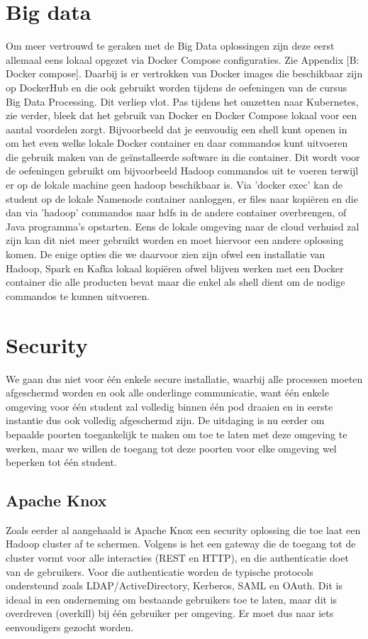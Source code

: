 \section{Big data}
Om meer vertrouwd te geraken met de Big Data oplossingen zijn deze eerst allemaal eens lokaal opgezet via Docker Compose configuraties. Zie Appendix [B: Docker compose].
Daarbij is er vertrokken van Docker images die beschikbaar zijn op DockerHub en die ook gebruikt worden tijdens de oefeningen van de cursus Big Data Processing.
\newline
\newline
Dit verliep vlot. Pas tijdens het omzetten naar Kubernetes, zie verder, bleek dat het gebruik van Docker en Docker Compose lokaal voor een aantal voordelen zorgt. Bijvoorbeeld dat je eenvoudig een shell kunt openen in om het even welke lokale Docker container en daar commandos kunt uitvoeren die gebruik maken van de geïnstalleerde software in die container. Dit wordt voor de oefeningen gebruikt om bijvoorbeeld Hadoop commandos uit te voeren terwijl er op de lokale machine geen hadoop beschikbaar is. Via 'docker exec' kan de student op de lokale Namenode container aanloggen, er files naar kopiëren en die dan via 'hadoop' commandos naar hdfs in de andere container overbrengen, of Java programma's opstarten.
Eens de lokale omgeving naar de cloud verhuisd zal zijn kan dit niet meer gebruikt worden en moet hiervoor een andere oplossing komen. De enige opties die we daarvoor zien zijn ofwel een installatie van Hadoop, Spark en Kafka lokaal kopiëren ofwel blijven werken met een Docker container die alle producten bevat maar die enkel als shell dient om de nodige commandos te kunnen uitvoeren.
\newline

\section{Security}
We gaan dus niet voor \'e\'en enkele secure installatie, waarbij alle processen moeten afgeschermd worden en ook alle onderlinge communicatie, want \'e\'en enkele omgeving voor \'e\'en student zal volledig binnen \'e\'en pod draaien en in eerste instantie dus ook volledig afgeschermd zijn.
De uitdaging is nu eerder om bepaalde poorten toegankelijk te maken om toe te laten met deze omgeving te werken, maar we willen de toegang tot deze poorten voor elke omgeving wel beperken tot \'e\'en student.

\subsection{Apache Knox}
Zoals eerder al aangehaald is Apache Knox een security oplossing die toe laat een Hadoop cluster af te schermen.
Volgens \textcite{Knox2023} is het een gateway die de toegang tot de cluster vormt voor alle interacties (REST en HTTP), en die authenticatie doet van de gebruikers. Voor die authenticatie worden de typische protocols ondersteund zoals LDAP/ActiveDirectory, Kerberos, SAML en OAuth. Dit is ideaal in een onderneming om bestaande gebruikers toe te laten, maar dit is overdreven (overkill) bij \'e\'en gebruiker per omgeving. Er moet dus naar iets eenvoudigers gezocht worden.

